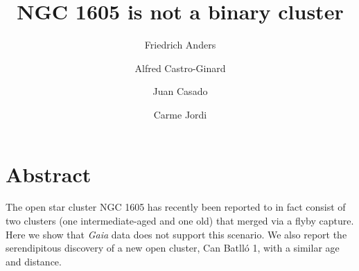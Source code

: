 \documentclass[RNAAS]{aastex631}
\begin{document}
\title{NGC 1605 is not a binary cluster}


\author[0000-0003-4524-9363]{Friedrich Anders}

\author[0000-0002-9419-3725]{Alfred Castro-Ginard}

\author[0000-0003-4105-2520]{Juan Casado}

\author[0000-0001-5495-9602]{Carme Jordi}


\section{Abstract}
The open star cluster NGC 1605 has recently been reported to in fact consist of two clusters (one intermediate-aged and one old) that merged via a flyby capture. Here we show that {\it Gaia} data does not support this scenario. We also report the serendipitous discovery of a new open cluster, Can Batlló 1, with a similar age and distance.
\end{document}
